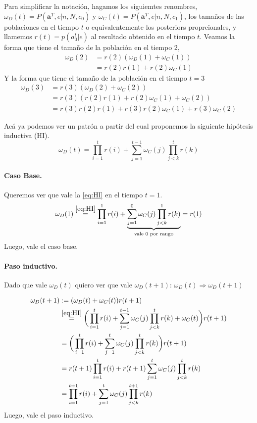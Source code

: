 \documentclass[a4paper,10pt]{article}
\begin{document}
Para simplificar la notación, hagamos los siguiemtes renombres, $\omega_D(t) = P(\bm{a}^T,e|n,N, c_0)$ y $\omega_C(t) = P(\bm{a}^T,e|n,N, c_1)$, los tamaños de las poblaciones en el tiempo $t$ o equivalentemente los posteriors proprcionales, y llamemos $r(t) =p(a_0^t|e) $ al resultado obtenido en el tiempo $t$.
Veamos la forma que tiene el tamaño de la población en el tiempo 2,
\begin{align}
\omega_D(2) & = r(2) ( \omega_D(1) + \omega_C(1) ) \\
& = r(2)r(1) + r(2)\omega_C(1)
\end{align}
Y la forma que tiene el tamaño de la población en el tiempo $t=3$
\begin{align}
\omega_D(3) & = r(3) (\omega_D(2)+\omega_C(2)) \\
& = r(3) (r(2)r(1) + r(2)\omega_C(1) + \omega_C(2) ) \\
& = r(3)r(2)r(1) + r(3)r(2)\omega_C(1) + r(3)\omega_C(2) 
\end{align}

Acá ya podemos ver un patrón a partir del cual proponemos la siguiente hipótesis inductiva (HI).
\begin{equation} \label{eq:HI} \tag{HI} 
\omega_D(t) = \prod^t_{i=1} r(i) + \sum^{t-1}_{j=1} \omega_C(j)
\prod^t_{j<k} r(k)
\end{equation}

\paragraph{Caso Base.} Queremos ver que vale la \ref{eq:HI} en el tiempo $t=1$.
\begin{equation} 
\omega_D(1) \overset{\ref{eq:HI}}{=} \prod^1_{i=1} r(i) + \underbrace{\sum^{0}_{j=1} \omega_C(j) \prod^1_{j<k} r(k) }_{\text{vale $0$ por rango}} = r(1)
\end{equation}
Luego, vale el caso base.

\paragraph{Paso inductivo.} Dado que vale $\omega_D(t)$ quiero ver que vale $\omega_D(t+1)$: $\omega_D(t) \Rightarrow \omega_D(t+1)$

\begin{equation}
\begin{split}
\omega_D(t+1) &:= (\omega_D(t) + \omega_C(t)) r(t+1)  \\
& \overset{\ref{eq:HI}}{=} \bigg( \prod^t_{i=1} r(i) + \sum^{t-1}_{j=1} \omega_C(j) \prod^t_{j<k} r(k) + \omega_C(t) \bigg) r(t+1) \\
& = \bigg( \prod^t_{i=1} r(i) + \sum^{t}_{j=1} \omega_C(j) \prod^t_{j<k} r(k)\bigg) r(t+1) \\
& = r(t+1) \prod^t_{i=1} r(i) + r(t+1) \sum^{t}_{j=1}  \omega_C(j) \prod^t_{j<k} r(k) \\ 
& = \prod^{t+1}_{i=1} r(i) + \sum^{t}_{j=1}  \omega_C(j) \prod^{t+1}_{j<k} r(k) \\
\end{split}
\end{equation}
Luego, vale el paso inductivo. \\
\end{document}
